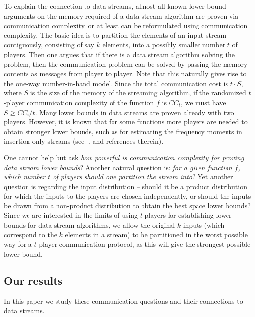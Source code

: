 \documentclass{toc}
\begin{document}
To explain the connection to data streams, almost all known lower bound arguments on the memory required of a data stream algorithm are proven via communication complexity, or at least can be reformulated using communication complexity. 
The basic idea is to partition the elements of an input stream contiguously, consisting of say $k$ elements, into a possibly smaller number $t$ of players. 
Then one argues that if there is a data stream algorithm  solving the problem, then the communication problem can be solved by passing the memory contents as messages from player to player. 
Note that this naturally gives rise to the one-way number-in-hand model. 
Since the total communication cost is $t \cdot S$, where $S$ is the size of the memory of the streaming algorithm, if the randomized $t$-player communication complexity of the function $f$ is $CC_t$, we must have $S \geq CC_t/t$. 
Many lower bounds in data streams are proven already with two players.
However, it is known that for some functions more  players are needed to obtain stronger lower bounds, such as for estimating the frequency moments in insertion only streams (see, \eg,
 \cite{BarYossef:2004eya,wz12} and references therein). 

One cannot help but ask \emph{how powerful is communication complexity for proving data stream lower bounds}? Another natural question is: \emph{for a given function $f$, which number $t$ of players should one partition the stream into}? 
Yet another question is regarding the input distribution -- should it be a product distribution for which the inputs to the players are chosen independently, 
or should the inputs be drawn from a non-product distribution to obtain the best space lower bounds? 
Since we are interested in the limits of using $t$ players for establishing lower bounds for data stream algorithms, we allow the original $k$ inputs (which correspond to the $k$ elements in a stream) to be partitioned in the worst possible way for a $t$-player communication protocol, as this will give the strongest possible lower bound.

\subsection{Our results}
In this paper we study these communication questions and their connections to data streams.
\end{document}
